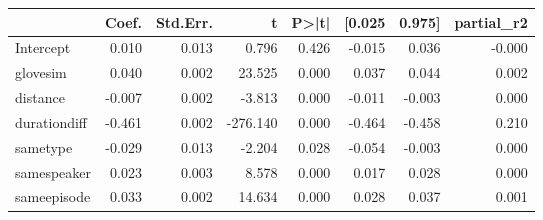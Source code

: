 \begin{tabular}{lrrrrrrr}
\toprule
{} &  Coef. &  Std.Err. &        t &  P>|t| &  [0.025 &  0.975] &  partial\_r2 \\
\midrule
Intercept    &  0.010 &     0.013 &    0.796 &  0.426 &  -0.015 &   0.036 &      -0.000 \\
glovesim     &  0.040 &     0.002 &   23.525 &  0.000 &   0.037 &   0.044 &       0.002 \\
distance     & -0.007 &     0.002 &   -3.813 &  0.000 &  -0.011 &  -0.003 &       0.000 \\
durationdiff & -0.461 &     0.002 & -276.140 &  0.000 &  -0.464 &  -0.458 &       0.210 \\
sametype     & -0.029 &     0.013 &   -2.204 &  0.028 &  -0.054 &  -0.003 &       0.000 \\
samespeaker  &  0.023 &     0.003 &    8.578 &  0.000 &   0.017 &   0.028 &       0.000 \\
sameepisode  &  0.033 &     0.002 &   14.634 &  0.000 &   0.028 &   0.037 &       0.001 \\
\bottomrule
\end{tabular}

